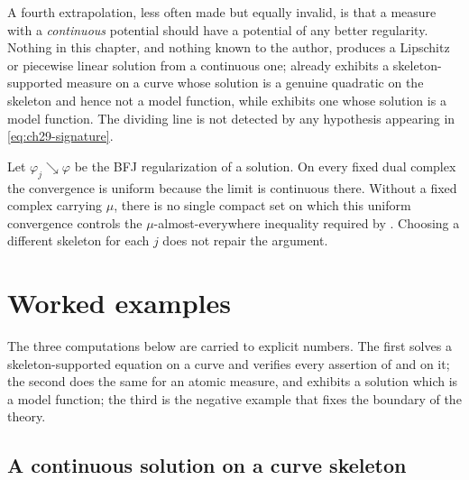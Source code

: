A fourth extrapolation, less often made but equally invalid, is that a
measure with a \emph{continuous} potential should have a potential of any
better regularity.  Nothing in this chapter, and nothing known to the
author, produces a Lipschitz or piecewise linear solution from a continuous
one;  already exhibits a
skeleton-supported measure on a curve whose solution is a genuine quadratic
on the skeleton and hence not a model function, while
 exhibits one whose solution is a model function.
The dividing line is not detected by any hypothesis appearing in
\eqref{eq:ch29-signature}.

\begin{example}
\label{ex:ch29-dini-localized}
Let \(\varphi_j\searrow\varphi\) be the BFJ regularization of a solution.
On every fixed dual complex the convergence is uniform because the limit is
continuous there.  Without a fixed complex carrying \(\mu\), there is no
single compact set on which this uniform convergence controls the
\(\mu\)-almost-everywhere inequality required by
.  Choosing a different skeleton for
each \(j\) does not repair the argument.
\end{example}

\section{Worked examples}
\label{sec:ch29-worked}

The three computations below are carried to explicit numbers.  The first
solves a skeleton-supported equation on a curve and verifies every
assertion of  and
 on it; the second does the same for an
atomic measure, and exhibits a solution which is a model function; the third
is the negative example that fixes the boundary of the theory.

\subsection{A continuous solution on a curve skeleton}
\label{sec:ch29-ex-curve}

